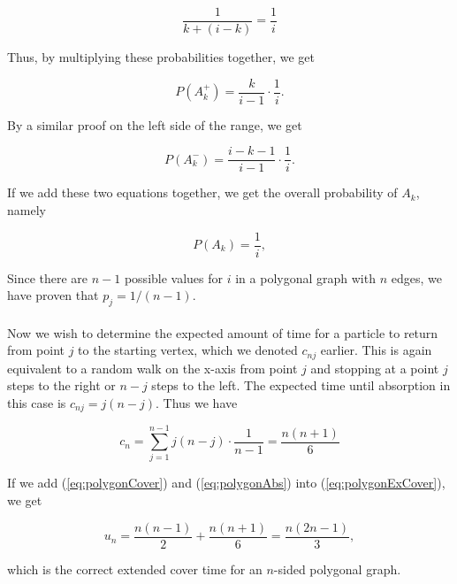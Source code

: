 \documentclass[11pt]{article}
\begin{document}
\begin{equation}
\frac{1}{k + (i - k)} = \frac{1}{i}
\end{equation}

\noindent Thus, by multiplying these probabilities together, we get

\begin{equation}
P(A_{k}^{+}) = \frac{k}{i - 1} \cdot \frac{1}{i}.
\end{equation}

\noindent By a similar proof on the left side of the range, we get

\begin{equation}
P(A_{k}^{-}) = \frac{i - k - 1}{i - 1} \cdot \frac{1}{i}.
\end{equation}

\noindent If we add these two equations together, we get the overall probability of $A_{k}$, namely

\begin{equation}
P(A_{k}) = \frac{1}{i},
\end{equation}

Since there are $n - 1$ possible values for $i$ in a polygonal graph with $n$ edges, we have proven that $p_{j} = 1/(n-1)$. 
\\
\\
\indent Now we wish to determine the expected amount of time for a particle to return from point $j$ to the starting vertex, which we denoted $c_{nj}$ earlier. This is again equivalent to a random walk on the x-axis from point $j$ and stopping at a point $j$ steps to the right or $n - j$ steps to the left. The expected time until absorption in this case is $c_{nj} = j(n-j)$. Thus we have 

\begin{equation}
c_{n} = \sum_{j=1}^{n-1} j(n - j) \cdot \frac{1}{n - 1} = \frac{n(n + 1)}{6}
\label{eq:polygonAbs}
\end{equation}

\noindent If we add (\ref{eq:polygonCover}) and (\ref{eq:polygonAbs}) into (\ref{eq:polygonExCover}), we get 

\begin{equation}
u_{n} = \frac{n(n-1)}{2} + \frac{n(n + 1)}{6} = \frac{n(2n - 1)}{3},
\end{equation}

\noindent which is the correct extended cover time for an $n$-sided polygonal graph.
\cite{BG}
\end{document}
